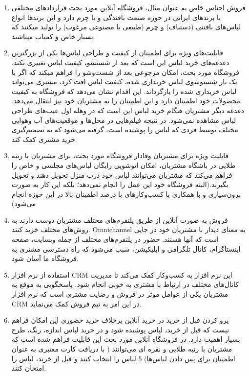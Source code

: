 \documentclass[14pt]{article}
\begin{document}
\begin{flushright}
\begin{enumerate}
\item فروش اجناس خاص
\newline
به عنوان مثال، فروشگاه آنلاین مورد بحث قرارداد‌های مختلفی با برند‌های ایرانی در حوزه صنعت بافندگی و یا چرم دارد و این برند‌ها انواع لباس‌های بافتنی (دستباف) و چرم (طبیعی یا مصنوعی مرغوب) را تولید میکنند که بسیار خاص و کمیاب میباشند.
\item قابلیت‌های ویژه برای اطمینان از کیفیت و طراحی لباس‌ها
\newline
یکی از بزرگترین دغدغه‌های خرید لباس این است که بعد از شستشو، کیفیت لباس تغییری نکند. فروشگاه مورد بحث، امکان مرجوعی بعد از شست‌وشو را فراهم میکند که اگر با یک بار شستوشوی لباس خریداری شده، کیفیت لباس افت کرد، مشتری می‌تواند لباس خریداری شده را بازگرداند. این اقدام نشان می‌‌دهد که فروشگاه به کیفیت محصولات خود اطمینان دارد و این اطمینان را به مشتریان خود نیز انتقال می‌دهد.
دغدغه دیگر مشتریان هنگام خرید لباس این است که در وهله اول عیب‌های طراحی لباس مشاهده نمی‌شود. در نتیجه فیلم‌هایی در محل‌ها و موقعیت‌های آب وهوایی مختلف توسط فردی که لباس را پوشیده است، گرفته می‌شود که به تصمیم‌گیری خرید مشتری کمک کند.

\item قابلیت ویژه برای مشتریان وفادار
\newline
فروشگاه مورد بحث، برای مشتریان با رتبه طلایی در باشگاه مشتریان، امکان اتوشویی رایگان لباس‌های مجلسی و خاص را فراهم می‌کند که مشتریان می‌توانند لباس خود درب منزل تحویل دهند و تحویل بگیرند.(البته فروشگاه خود این عمل را انجام نمی‌دهد؛ بلکه این کار به صورت برون‌سپاری و با همکاری با کسب‌وکارهای با درصد اطمینان بالا در این حوزه انجام می‌شود)

\item فروش به صورت آنلاین از طریق پلتفرم‌های مختلف
\newline
مشتریان دوست دارند به روش‌های مختلف خرید کنند. Omnichannel به معنای دیدار با مشتریان خود در جایی است كه آنها هستند. حضور در پلتفرم‌های مختلف از جمله وبسایت، صفحه اینستاگرام، کانال تلگرامی و اپلیکیشن، سبب می‌شود که راه دسترسی مشتری به فروشگاه ما آسان شود.

\item استفاده از نرم افزار CRM 
\newline
این نرم افزار به کسب‌وکار کمک می‌کند تا مدیریت کانال‌های مختلف در ارتباط با مشتری به خوبی انجام شود. پاسخگویی به موقع به مشتریان یکی از عوامل موثر در فروش و رضایت مشتری است که نرم افزار CRM در این امر به تیم فروش کمک می‌نماید.

\item پرو کردن قبل از خرید
\newline
در خرید آنلاین برخلاف خرید حضوری این امکان فراهم نیست که قبل از خرید، لباس پوشیده شود و در خرید لباس اندازه، رنگ، طرح بسیار اهمیت دارد. در فروشگاه آنلاین مورد بحث این قابلیت فراهم شده است که مشتریان با رتبه طلایی و نقره ای می‌توانند ( با دریافت کارت معتبری به عنوان اطمینان برای پس دادن لباس‌ها) 5 لباس را انتخاب کنند و قبل از خرید، لباس را امتحان کنند.



\end{enumerate}
\end{flushright}
\end{document}
